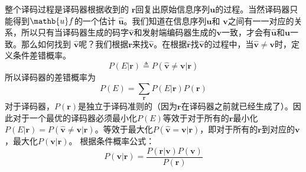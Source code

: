 \documentclass[10pt,a4paper,UTF8]{article}
\begin{document}
整个译码过程是译码器根据收到的 \(\mathbf{r}\)回复出原始信息序列\(\mathbf{u}\)的过程。当然译码器只能得到\(\mathb{u}f\)的一个估计 \(\hat{\mathbf{u}}\)。我们知道在信息序列\(\mathbf{u}\)和 \(\mathbf{v}\)之间有一一对应的关系，所以只有当译码器生成的码字\(\hat{\mathbf{v}}\)和发射端编码器生成的\({\mathbf{v}}\)一致，才会有\(\hat{\mathbf{u}}\)和\({\mathbf{u}}\)一致。那么如何找到 \(\hat{\mathbf{v}}\)呢？我们根据\({\mathbf{r}}\)来找\(\hat{\mathbf{v}}\)。在根据\(\hat{\mathbf{r}}\)找\(\hat{\mathbf{v}}\)的过程中，当\(\hat{\mathbf{v}} \neq \mathbf{v}\)时，定义条件差错概率。
\begin{equation}
\label{eq:0107}
P(E|\mathbf{r})  \triangleq P(\hat{\mathbf{v}} \neq \mathbf{v}| \mathbf{r})
\end{equation}
所以译码器的差错概率为
\begin{equation}
\label{eq:0108}
P(E) = \sum_{\mathbf{r}} P(E|\mathbf{r}) P(\mathbf{r})
\end{equation}
对于译码器，\(P(\mathbf{r})\)是独立于译码准则的（因为\(\mathbf{r}\)在译码器之前就已经生成了）。因此对于一个最优的译码器必须最小化\(P(E)\)等效于对于所有的\(\mathbf{r}\)最小化\(P(E|\mathbf{r})=P(\hat{\mathbf{v}} \neq \mathbf{v}|\mathbf{r})\)。等效于最大化\(P(\hat{\mathbf{v}} = \mathbf{v}|\mathbf{r})\)，即对于所有的\(\mathbf{r}\)到对应的\(\mathbf{v}\)，最大化\(P(\mathbf{v}|\mathbf{r})\)。 根据条件概率公式：
\begin{equation}
\label{eq:0109}
P(\mathbf{v}|\mathbf{r}) = \frac{P(\mathbf{r}|\mathbf{v})P(\mathbf{v})}{P(\mathbf{r})}
\end{equation}
\end{document}

